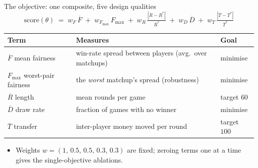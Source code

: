 \documentclass[10pt,aspectratio=169]{beamer}
\begin{document}
\begin{frame}{The objective: one composite, five design qualities}
  \[
    \text{score}(\theta) \;=\; w_F\,\overline{F} \;+\; w_{F_{\max}}\,F_{\max}
    \;+\; w_R\,\tfrac{|\overline{R}-R^*|}{R^*} \;+\; w_D\,\overline{D}
    \;+\; w_T\,\tfrac{|\overline{T}-T^*|}{T^*}
  \]
  \vspace{0.2em}
  \begin{center}
  \small
  \begin{tabular}{lll}
    \toprule
    Term & Measures & Goal \\
    \midrule
    $\overline{F}$ mean fairness     & win-rate spread between players (avg.\ over matchups) & minimise \\
    $F_{\max}$ worst-pair fairness   & the \emph{worst} matchup's spread (robustness)        & minimise \\
    $\overline{R}$ length            & mean rounds per game                                  & target $60$ \\
    $\overline{D}$ draw rate         & fraction of games with no winner                      & minimise \\
    $\overline{T}$ transfer          & inter-player money moved per round                    & target $100$ \\
    \bottomrule
  \end{tabular}
  \end{center}
  \vspace{0.4em}
  \begin{itemize}\small
    \item Weights $w=(1,\,0.5,\,0.5,\,0.3,\,0.3)$ are fixed; zeroing terms one at a time gives the single-objective ablations.
  \end{itemize}
\end{frame}
\end{document}
